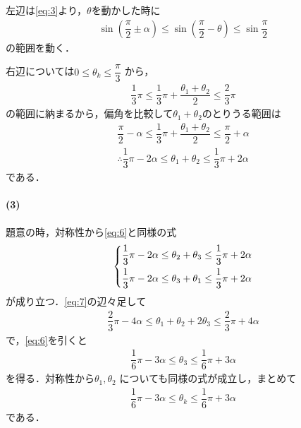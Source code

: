 \documentclass[../../main.tex]{subfiles}
\begin{document}
左辺は\cref{eq:3}より，$\theta$を動かした時に
\begin{align}
  \sin(\dfrac{\pi}{2}\pm \alpha) \le \sin(\dfrac{\pi}{2} - \theta) \le \sin \dfrac{\pi}{2}
\end{align}
の範囲を動く．

右辺については$0 \le \theta_k \le \dfrac{\pi}{3}$ から，
\begin{align}
  \dfrac{1}{3}\pi \le \dfrac{1}{3}\pi + \dfrac{\theta_1 + \theta_2}{2} \le \dfrac{2}{3}\pi
\end{align}
の範囲に納まるから，偏角を比較して$\theta_1+\theta_2$のとりうる範囲は
\begin{align}
  \dfrac{\pi}{2} - \alpha \le \dfrac{1}{3}\pi + \dfrac{\theta_1 + \theta_2}{2} \le \dfrac{\pi}{2} + \alpha \\
  \therefore
  \dfrac{1}{3}\pi - 2\alpha \le \theta_1 + \theta_2 \le \dfrac{1}{3}\pi + 2\alpha \label{eq:6}
\end{align}
である．

\paragraph{(3)}

題意の時，対称性から\cref{eq:6}と同様の式
\begin{align}
  \begin{dcases}
    \dfrac{1}{3}\pi - 2\alpha \le \theta_2 + \theta_3 \le \dfrac{1}{3}\pi + 2\alpha \\
    \dfrac{1}{3}\pi - 2\alpha \le \theta_3 + \theta_1 \le \dfrac{1}{3}\pi + 2\alpha
  \end{dcases} \label{eq:7}
\end{align}
が成り立つ．\cref{eq:7}の辺々足して
\begin{align}
  \dfrac{2}{3}\pi - 4\alpha \le \theta_1 + \theta_2 + 2\theta_3 \le \dfrac{2}{3}\pi + 4\alpha
\end{align}
で，\cref{eq:6}を引くと
\begin{align}
  \dfrac{1}{6}\pi - 3\alpha \le \theta_3 \le \dfrac{1}{6}\pi + 3\alpha
\end{align}
を得る．対称性から$\theta_1, \theta_2$ についても同様の式が成立し，まとめて
\begin{align}
  \dfrac{1}{6}\pi - 3\alpha \le \theta_k \le \dfrac{1}{6}\pi + 3\alpha \label{eq:8}
\end{align}
である．
\end{document}
